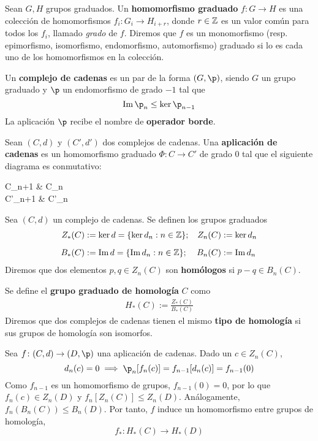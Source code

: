 Sean $G,H$ grupos graduados.
Un \textbf{homomorfismo graduado} $f\colon G \to H$ es una colección de homomorfismos $f_i\colon G_i \to H_{i+r}$, donde $r \in \mathbb{Z}$ es un valor común para todos los $f_i$, llamado \emph{grado} de $f$.
Diremos que $f$ es un monomorfismo (resp. epimorfismo, isomorfismo, endomorfismo, automorfismo) graduado si lo es cada uno de los homomorfismos en la colección.

\begin{definition}
	Un \textbf{complejo de cadenas} es un par de la forma $(G,\p)$, siendo $G$ un grupo graduado y $\p$ un endomorfismo de grado $-1$ tal que
		\[\im  \p_n \leq \ker \p_{n-1}\]
	La aplicación $\p$ recibe el nombre de \textbf{operador borde}.
\end{definition}

\begin{definition}
Sean $(C,d)$ y $(C',d')$ dos complejos de cadenas.
Una \textbf{aplicación de cadenas} es un homomorfismo graduado $\Phi\colon C \to C'$ de grado $0$ tal que el siguiente diagrama es conmutativo:
	\begin{diagram*}
	C_{n+1}   & C_n  \\
	C'_{n+1}                      & C'_n                   
	\end{diagram*}
\end{definition}

Sea $(C,d)$ un complejo de cadenas.
Se definen los grupos graduados
	\begin{align*}
		Z_*(C)&:=\ker d=\{\ker d_n: n \in \mathbb{Z}\};	& Z_n(C)&:=\ker d_n\\[0.2cm]
		B_*(C)&:=\operatorname{Im} d=\{\operatorname{Im} d_n: n \in \mathbb{Z}\}; 	& B_n(C)&:=\operatorname{Im} d_n
	\end{align*}
Diremos que dos elementos $p,q \in Z_n(C)$ son \textbf{homólogos} si $p-q \in B_n(C)$.

\begin{definition}
	Se define el \textbf{grupo graduado de homología} $C$ como 
		\begin{align*}
			H_*(C):=\frac{Z_*(C)}{B_*(C)}
		\end{align*}
	Diremos que dos complejos de cadenas tienen el mismo \textbf{tipo de homología} si sus grupos de homología son isomorfos.
\end{definition}

Sea $f\colon (C,d) \to (D,\p)$ una aplicación de cadenas.
Dado un $c \in Z_n(C)$,
	\[d_n(c)=0 \implies \p_n[f_n(c)]=f_{n-1}[d_n(c)]=f_{n-1}(0)\]
Como $f_{n-1}$ es un homomorfismo de grupos, $f_{n-1}(0)=0$, por lo que $f_n(c)\in Z_n(D)$ y $f_n[Z_n(C)]\leq Z_n(D)$.
Análogamente, $f_n(B_n(C)) \leq B_n(D)$.
Por tanto, $f$ induce un homomorfismo entre grupos de homología,
	\[f_*\colon H_*(C) \to H_*(D)\]

